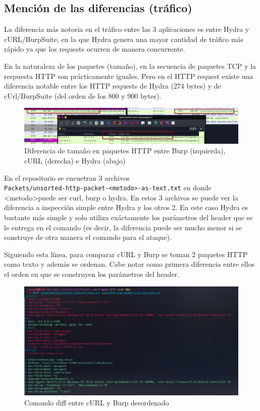 \documentclass[letter,12pt]{article}
\newcommand{\code}[1]{\colorbox{lightgray!80}{\lstinline[breaklines=true]|#1|}}
\begin{document}
\subsection{Mención de las diferencias (tráfico)}
La diferencia más notoria en el tráfico entre las 3 aplicaciones es entre Hydra
y cURL/BurpSuite, en la que Hydra genera una mayor cantidad de tráfico más
rápido ya que los requests ocurren de manera concurrente.

En la naturaleza de los paquetes (tamaño), en la secuencia de paquetes TCP y la
respuesta HTTP son prácticamente iguales. Pero en el HTTP request existe una
diferencia notable entre los HTTP requests de Hydra (274 bytes) y de
cUrl/BurpSuite (del orden de los 800 y 900 bytes).

\begin{figure}[H]
  \centering
  \includegraphics[width=16.5cm]{images/26-diff-in-size.png}
  \caption{Diferencia de tamaño en paquetes HTTP entre Burp (izquierda), cURL
    (derecha) e Hydra (abajo)}
\end{figure}

En el repositorio se encuetran 3 archivos \\
\code{Packets/unsorted-http-packet-<metodo>-as-text.txt} en donde \textless metodo\textgreater puede
ser curl, burp o hydra. En estos 3 archivos se puede ver la diferencia a
inspección simple entre Hydra y los otros 2. En este caso Hydra es bastante más
simple y solo utiliza exáctamente los parámetros del header que se le entrega en
el comando (es decir, la diferencia puede ser mucho menor si se construye de
otra manera el comando para el ataque).

Siguiendo esta línea, para comparar cURL y Burp se toman 2 paquetes HTTP como
texto y además se ordenan. Cabe notar como primera diferencia entre ellos el
orden en que se construyen los parámetros del header.

\begin{figure}[H]
  \centering
  \includegraphics[width=16.5cm]{images/24-unsorted-diff-burp-curl.png}
  \caption{Comando diff entre cURL y Burp desordenado}
\end{figure}
\end{document}
